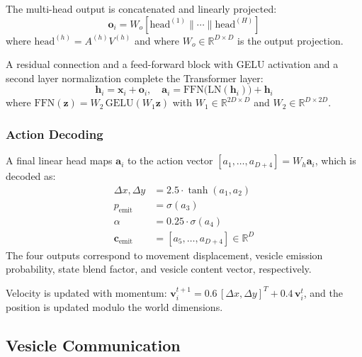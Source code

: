 \documentclass[10pt,twocolumn]{article}
\begin{document}
The multi-head output is concatenated and linearly projected:
\begin{equation}
  \mathbf{o}_i = W_o [\text{head}^{(1)} \| \cdots \| \text{head}^{(H)}]
  \label{eq:mha_output}
\end{equation}
where $\text{head}^{(h)} = A^{(h)} V^{(h)}$ and
where $W_o \in \mathbb{R}^{D \times D}$ is the output projection.

A residual connection and a feed-forward block with GELU activation and a second layer normalization complete the Transformer layer:
\begin{equation}
  \mathbf{h}_i = \mathbf{x}_i + \mathbf{o}_i, \quad
  \mathbf{a}_i = \text{FFN}\!\big(\text{LN}(\mathbf{h}_i)\big) + \mathbf{h}_i
  \label{eq:ffn}
\end{equation}
where $\text{FFN}(\mathbf{z}) = W_2\, \text{GELU}(W_1 \mathbf{z})$ with $W_1 \in \mathbb{R}^{2D \times D}$ and $W_2 \in \mathbb{R}^{D \times 2D}$.

\subsubsection{Action Decoding}

A final linear head maps $\mathbf{a}_i$ to the action vector $[a_1, \ldots, a_{D+4}] = W_h \mathbf{a}_i$, which is decoded as:
\begin{align}
  \Delta x, \Delta y &= 2.5 \cdot \tanh(a_1, a_2) \label{eq:action_move} \\
  p_{\text{emit}} &= \sigma(a_3) \label{eq:action_emit} \\
  \alpha &= 0.25 \cdot \sigma(a_4) \label{eq:action_alpha} \\
  \mathbf{c}_{\text{emit}} &= [a_5, \ldots, a_{D+4}] \in \mathbb{R}^D \label{eq:action_content}
\end{align}
The four outputs correspond to movement displacement, vesicle emission probability, state blend factor, and vesicle content vector, respectively.

Velocity is updated with momentum: $\mathbf{v}_i^{t+1} = 0.6\, [\Delta x, \Delta y]^T + 0.4\, \mathbf{v}_i^t$, and the position is updated modulo the world dimensions.


\subsection{Vesicle Communication}
\label{sec:vesicle}
\end{document}
